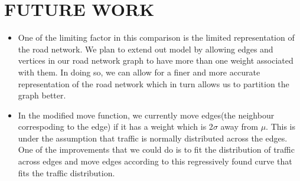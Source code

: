 \section{FUTURE WORK}
\label{sec:futu}

\begin{itemize}
\item One of the limiting factor in this comparison is the limited representation of the road network. We plan to extend out model by allowing edges and vertices in our road network graph to have more than one weight associated with them. In doing so, we can allow for a finer and more accurate representation of the road network which in turn allows us to partition the graph better.
\item In the modified move function, we currently move edges(the neighbour correspoding to the edge) if it has a weight which is 2$\sigma$ away from $\mu$. This is under the assumption that traffic is normally distributed across the edges. One of the improvements that we could do is to fit the distribution of traffic across edges and move edges according to this regressively found curve that fits the traffic distribution.
\end{itemize}